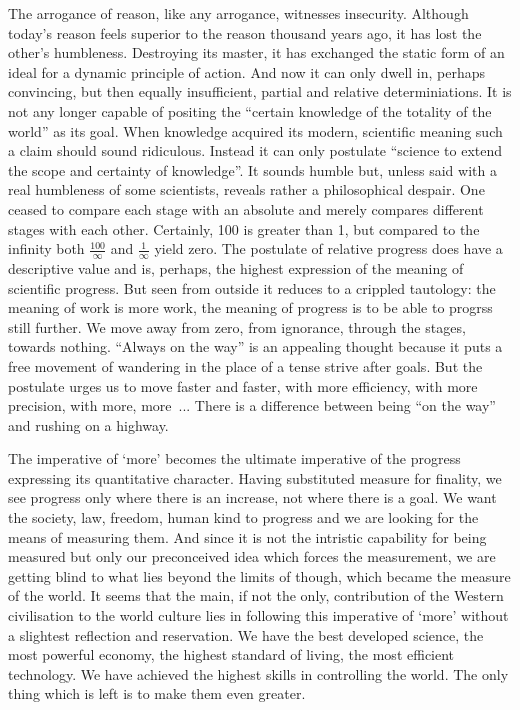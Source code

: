 The arrogance of reason, like any arrogance, witnesses insecurity.
Although today's reason feels superior to the reason thousand years ago,
it has lost the other's humbleness. Destroying its master, it has exchanged
the static form of an ideal for a dynamic principle of action. And now it can
only dwell in, perhaps convincing, but then equally insufficient, partial and
relative determiniations. It is not any longer capable of positing the 
``certain knowledge of the totality of the world'' as its goal. 
When knowledge acquired its modern, scientific meaning such a claim should
sound ridiculous. Instead it
can only postulate ``science to extend the scope and certainty of knowledge''.
It sounds humble but, unless said with a real humbleness of some scientists,
reveals rather a philosophical despair. One ceased to compare each stage 
with an absolute and merely compares different stages with each other.
Certainly, 100 is greater than 1, but compared to the infinity both 
$\frac{100}{\infty}$ and $\frac{1}{\infty}$ yield zero. The postulate of relative
progress does have a descriptive value and is, perhaps, the highest expression
of the meaning of scientific progress. But seen from
outside it reduces to a crippled tautology: the meaning of work is more work, the
meaning of progress is to be able to progrss still further. We move away from
zero, from ignorance, through the stages, towards nothing. ``Always on the 
way'' is an appealing thought because it puts a free movement of wandering in
the place of a tense strive after goals. But the postulate urges us to move
faster and faster, with more efficiency, with more precision, with more, 
more~... There is a difference between being ``on the way'' and rushing on a 
highway.

The imperative of `more' becomes the ultimate imperative of the progress
expressing its quantitative character. Having substituted measure for finality,
we see progress only where there is an increase, not where there is a goal. 
We want the society,
law, freedom, human kind to progress and we are looking for the means of 
measuring them. And since it is not the intristic capability for being measured
but only our preconceived idea which forces the measurement, we
are getting blind to what lies beyond the limits of though, which became
the measure of the world.
It seems that the main, if not the only, contribution of the Western civilisation 
to the world culture lies in following this imperative of `more' without
a slightest reflection and reservation. We have the best developed science,
the most powerful economy, the highest standard of living, the most efficient
technology. We have achieved the highest skills in controlling the world. The
only thing which is left is to make them even greater.

